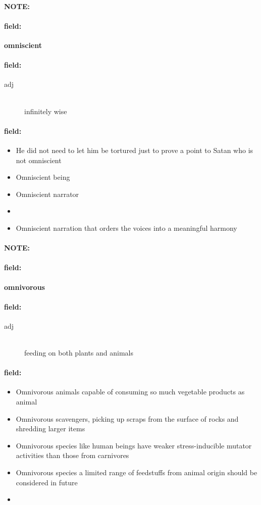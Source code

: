 \documentclass[12pt]{article}
\newenvironment{note}{\paragraph{NOTE:}}{}
\newenvironment{field}{\paragraph{field:}}{}
\begin{document}
\begin{note}
\begin{field}
\textbf{\large omniscient}
\end{field}


\begin{field}
\begin{description}
\item[adj] \hfill \\ 
infinitely wise

\end{description}
\end{field}

\begin{field}
\begin{itemize}
\item He did not need to let him be tortured just to prove a point to Satan who is not omniscient
\item Omniscient being
\item Omniscient narrator
\item 
\item Omniscient narration that orders the voices into a meaningful harmony
\end{itemize}
\end{field}
\end{note}
\begin{note}
\begin{field}
\textbf{\large omnivorous}
\end{field}


\begin{field}
\begin{description}
\item[adj] \hfill \\ 
feeding on both plants and animals

\end{description}
\end{field}

\begin{field}
\begin{itemize}
\item Omnivorous animals capable of consuming so much vegetable products as animal
\item Omnivorous scavengers, picking up scraps from the surface of rocks and shredding larger items
\item Omnivorous species like human beings have weaker stress-inducible mutator activities than those from carnivores
\item Omnivorous species a limited range of feedstuffs from animal origin should be considered in future
\item 
\end{itemize}
\end{field}
\end{note}
\end{document}
